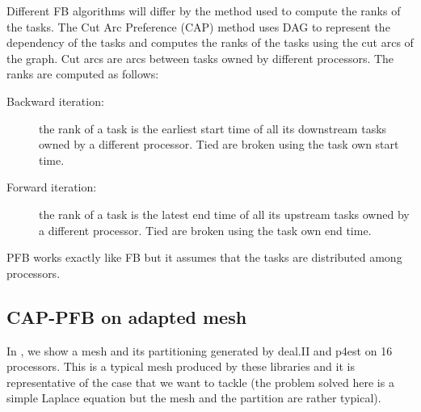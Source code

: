 \documentclass{mc2015}
\renewcommand{\(}{\left(}
\renewcommand{\)}{\right)}
\renewcommand{\[}{\left[}
\renewcommand{\]}{\right]}
\begin{document}
Different FB algorithms will differ by the method used to compute the ranks of the tasks. The
Cut Arc Preference (CAP) method uses DAG to represent the dependency of the
tasks and computes the ranks of the tasks using the cut arcs of the graph. Cut
arcs are arcs between tasks owned by different processors. The ranks are
computed as follows:
\begin{description}
  \item[Backward iteration:] the rank of a task is the earliest start time of all its downstream tasks
    owned by a different processor. Tied are broken using the task own start time.
  \item[Forward iteration:] the rank of a task is the latest end time of all its upstream tasks owned
    by a different processor. Tied are broken using the task own end time.
\end{description}
PFB works exactly like FB but it assumes that the tasks are distributed among processors.

\subsection{CAP-PFB on adapted mesh}

In , we show a mesh and its partitioning generated by deal.II and p4est 
on 16 processors. This is a typical mesh produced by these libraries and it is
representative of the case that we want to tackle (the problem solved here is a
simple Laplace equation but the mesh and the partition are rather typical). 
\end{document}
